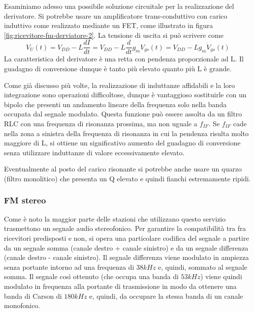 Esaminiamo adesso una possibile soluzione circuitale per
la realizzazione del derivatore. Si potrebbe usare un amplificatore trans-conduttivo con carico induttivo come realizzato mediante un FET, come illustrato in figura \ref{fig:ricevitore-fm-derviatore-2}. La tensione di uscita si può scrivere come
\[
V_U (t)= V_{DD} - L\frac{dI}{dt} = V_{DD} - L\frac{d}{dt} g_mV_{gs}(t) = V_{DD} - L g_m \dot V_{gs}(t)
\]
La caratteristica del derivatore è una retta con pendenza proporzionale ad L. Il guadagno di conversione dunque è tanto più elevato quanto più L è grande.

Come già discusso più volte, la realizzazione di induttanze affidabili e la loro integrazione sono operazioni difficoltose, dunque è vantaggioso sostituirle con un bipolo che presenti un andamento lineare della frequenza solo nella banda occupata dal segnale modulato. Questa funzione può essere assolta da un filtro RLC con una frequenza di risonanza prossima, ma non uguale a $f_{IF}$. Se $f_{IF}$ cade nella zona a sinistra della frequenza di risonanza in cui la pendenza risulta molto maggiore di L, si ottiene un significativo aumento del guadagno di conversione senza utilizzare induttanze di valore eccessivamente elevato.

Eventualmente al posto del carico risonante si potrebbe anche usare un quarzo (filtro monolitico) che presenta un Q elevato e quindi fianchi estremamente ripidi.

\begin{figure}[hbt]
	\hspace{\fill}
	\hspace{\fill}
	\hspace{\fill}
	\caption{}
	\label{fig:ricevitore-fm-derviatore-4}
\end{figure}


\subsubsection{FM stereo}

Come è noto la maggior parte delle stazioni che utilizzano questo servizio trasmettono un segnale audio stereofonico. Per garantire la compatibilità tra fra ricevitori predisposti e non, si opera una particolare codifica del segnale a partire da un segnale somma (canale destro + canale sinistro) e da un segnale differenza (canale destro - canale sinistro). Il segnale differenza viene modulato in ampiezza senza portante intorno ad una frequenza di $38 kHz$ e, quindi, sommato al segnale somma. Il segnale così ottenuto (che occupa una banda di $53 kHz$) viene quindi modulato in frequenza alla portante di trasmissione in modo da ottenere una banda di Carson di $180 kHz$ e, quindi, da occupare la stessa banda di un canale monofonico.

